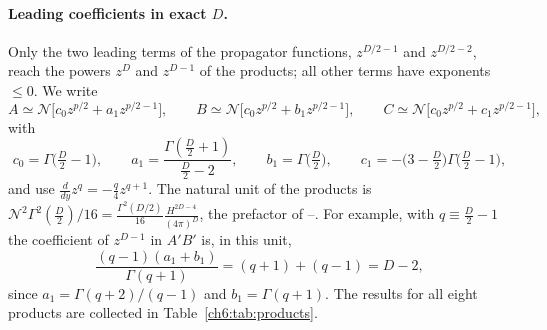 \paragraph{Leading coefficients in exact $D$.} Only the two leading terms of the propagator functions, $z^{D/2-1}$ and $z^{D/2-2}$, reach the
powers $z^D$ and $z^{D-1}$ of the products; all other terms have exponents $\le0$. We write
\begin{equation}
A\simeq\mathcal N\big[c_0z^{p/2}+a_1z^{p/2-1}\big],\qquad B\simeq\mathcal N\big[c_0z^{p/2}+b_1z^{p/2-1}\big],\qquad
C\simeq\mathcal N\big[c_0z^{p/2}+c_1z^{p/2-1}\big],
\end{equation}
with
\begin{equation}
c_0=\Gamma\big(\tfrac D2-1\big),\qquad a_1=\frac{\Gamma(\frac D2+1)}{\frac D2-2},\qquad b_1=\Gamma\big(\tfrac D2\big),\qquad
c_1=-\big(3-\tfrac D2\big)\Gamma\big(\tfrac D2-1\big),
\end{equation}
and use $\frac{d}{dy}z^q=-\frac q4z^{q+1}$. The natural unit of the products is $\mathcal N^2\Gamma^2(\frac D2)/16=\frac{\Gamma^2(D/2)}{16}\frac{H^{2D-4}}{(4\pi)^D}$,
the prefactor of --. For example, with $q\equiv\frac D2-1$ the coefficient of $z^{D-1}$ in $A'B'$ is, in this unit,
\begin{equation}
\frac{(q-1)(a_1+b_1)}{\Gamma(q+1)}=(q+1)+(q-1)=D-2 ,
\end{equation}
since $a_1=\Gamma(q+2)/(q-1)$ and $b_1=\Gamma(q+1)$. The results for all eight products are collected in Table~\ref{ch6:tab:products}.

